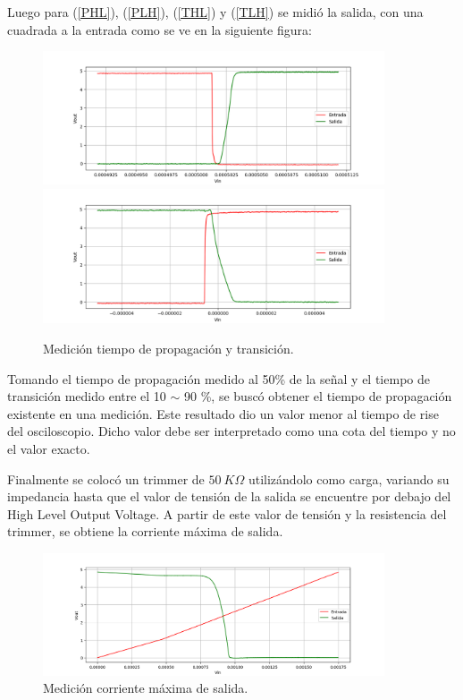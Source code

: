 Luego para (\ref{PHL}), (\ref{PLH}), (\ref{THL}) y (\ref{TLH}) se midió la salida, con una cuadrada a la entrada como se ve en la siguiente figura:
\begin{figure}[H]	
	\centering
	\includegraphics[width=0.9\textwidth]{ImagenesEjercicio1/DC-SWEEP/0t1mtl.PNG}
	\includegraphics[width=0.9\textwidth]{ImagenesEjercicio1/DC-SWEEP/1t0mtl.PNG}
	\caption{Medición tiempo de propagación y transición.}
	\label{fig:MedicionTiempos}
\end{figure}

Tomando el tiempo de propagación medido al 50\% de la señal y el tiempo de transición medido entre el 10 $\sim$ 90 \%, se buscó obtener el tiempo de propagación existente en una medición. Este resultado dio un valor menor al tiempo de rise del osciloscopio. Dicho valor debe ser interpretado como una cota del tiempo y no el valor exacto. 

Finalmente se colocó un trimmer de $50 \ K\Omega$ utilizándolo como carga, variando su impedancia hasta que el valor de tensión de la salida se encuentre por debajo del High Level Output Voltage. A partir de este valor de tensión y la resistencia del trimmer, se obtiene la corriente máxima de salida.
\begin{figure}[H]	
	\centering
	\includegraphics[width=0.9\textwidth]{ImagenesEjercicio1/DC-SWEEP/OutputCurrent.PNG}
	\caption{Medición corriente máxima de salida.}
	\label{fig:OutputCurrent}
\end{figure}

